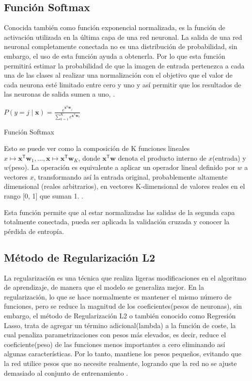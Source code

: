 	\subsection{Función Softmax}
		Conocida también como función exponencial normalizada, es la función de activación utilizada en la última capa de una red neuronal. La salida de una red neuronal completamente conectada no es una distribución de probabilidad, sin embargo, el uso de esta función ayuda a obtenerla. Por lo que esta función permitirá estimar la probabilidad de que la imagen de entrada pertenezca a cada una de las clases al realizar una normalización con el objetivo que el valor de cada neurona esté limitado entre cero y uno y así permitir que los resultados de las neuronas de salida sumen a uno, \citep{Bishop}. 

			\begingroup\makeatletter{}\check@mathfonts
			\begin{center}
			${\displaystyle P(y=j\mid \mathbf {x} )={\frac {e^{\mathbf {x} ^{\mathsf {T}}\mathbf {w} _{j}}}{\sum _{k=1}^{K}e^{\mathbf {x} ^{\mathsf {T}}\mathbf {w} _{k}}}}}$
			\end{center}
			\begin{center}
			{\small{Función Softmax}}
			\end{center}
			\endgroup
			
		Esto se puede ver como la composición de K funciones lineales ${x} \mapsto \mathbf {x} ^{\mathsf {T}}\mathbf {w} _{1},\ldots ,\mathbf {x} \mapsto \mathbf {x} ^{\mathsf {T}}\mathbf {w} _{K}$, donde ${\mathbf {x} ^{\mathsf {T}}\mathbf {w}}$ denota el producto interno de $x$(entrada) y $w$(peso).	La operación es equivalente a aplicar un operador lineal definido por $ w $ a vectores $ x $, transformando así la entrada original, probablemente altamente dimensional (reales arbitrarios), en vectores K-dimensional de valores reales en el rango [0, 1] que suman 1. \citep{Bishop}. 

		Esta función permite que al estar normalizadas las salidas de la segunda capa totalmente conectada, pueda ser aplicada la validación cruzada y conocer la pérdida de entropía.

	
	\subsection{Método de Regularización L2}
		La regularización es una técnica que realiza ligeras modificaciones en el algoritmo de aprendizaje, de manera que el modelo se generaliza mejor. En la regularización, lo que se hace normalmente es mantener el mismo número de funciones, pero se reduce la magnitud de los coeficientes(pesos de neuronas), sin embargo, el método de Regularización L2 o también conocido como Regresión Lasso, trata de agregar un término adicional(lambda) a la función de coste, la cual penaliza parametrizaciones con pesos más elevados, es decir, reduce el coeficiente(peso) de las funciones menos importantes a cero eliminando así algunas características. Por lo tanto, mantiene los pesos pequeños, evitando que la red utilice pesos que no necesite realmente, logrando que la red no se ajuste demasiado al conjunto de entrenamiento \citep{AulaMLP}.

